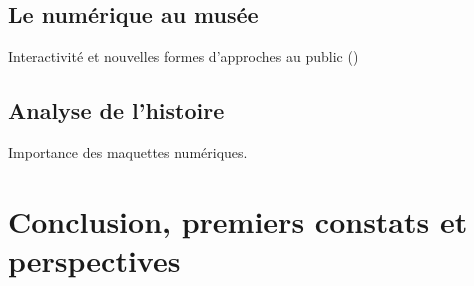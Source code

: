 \documentclass[a4paper,11pt,french]{article}
\begin{document}
\subsection{Le numérique au musée}
Interactivité et nouvelles formes d'approches au public ()
\cite{LAROCHE-2010-473007}

\subsection{Analyse de l'histoire}
Importance des maquettes numériques\cite{Cotte2009}.

\section{Conclusion, premiers constats et perspectives}


\newpage
\singlespacing
\begin{footnotesize}
   
  
  \nocite{*}
\end{footnotesize}
\doublespacing
\end{document}
